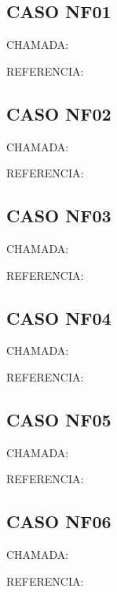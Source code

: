 \documentclass{undftex}
\begin{document}
\begin{refsection}\section*{CASO NF01}\noindent CHAMADA: \par\noindent REFERENCIA:\par\printbibliography[heading=none]\end{refsection}\clearpage
\begin{refsection}\section*{CASO NF02}\noindent CHAMADA: \par\noindent REFERENCIA:\par\printbibliography[heading=none]\end{refsection}\clearpage
\begin{refsection}\section*{CASO NF03}\noindent CHAMADA: \par\noindent REFERENCIA:\par\printbibliography[heading=none]\end{refsection}\clearpage
\begin{refsection}\section*{CASO NF04}\noindent CHAMADA: \par\noindent REFERENCIA:\par\printbibliography[heading=none]\end{refsection}\clearpage
\begin{refsection}\section*{CASO NF05}\noindent CHAMADA: \par\noindent REFERENCIA:\par\printbibliography[heading=none]\end{refsection}\clearpage
\begin{refsection}\section*{CASO NF06}\noindent CHAMADA: \par\noindent REFERENCIA:\par\printbibliography[heading=none]\end{refsection}\clearpage
\end{document}
